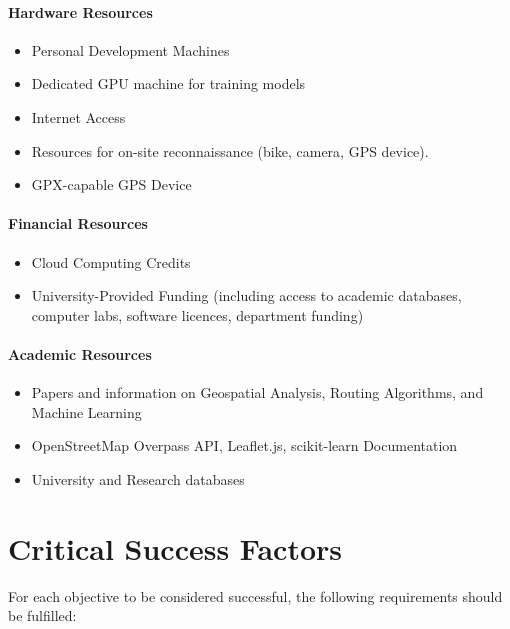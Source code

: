 \documentclass{article}
\begin{document}
\paragraph{Hardware Resources}
\begin{itemize}
	\item Personal Development Machines
	\item Dedicated GPU machine for training models
	\item Internet Access
	\item Resources for on-site reconnaissance (bike, camera, GPS device).
	\item GPX-capable GPS Device
\end{itemize}
\paragraph{Financial Resources}
\begin{itemize}
	\item Cloud Computing Credits
	\item University-Provided Funding (including access to academic databases, computer labs, software licences, department funding)

\end{itemize}
\paragraph{Academic Resources}
\begin{itemize}
	\item Papers and information on Geospatial Analysis, Routing Algorithms, and Machine Learning
	\item OpenStreetMap Overpass API, Leaflet.js, scikit-learn Documentation
	\item University and Research databases
\end{itemize}

\newpage
\section{Critical Success Factors}
For each objective to be considered successful, the following requirements should be fulfilled:
\end{document}
